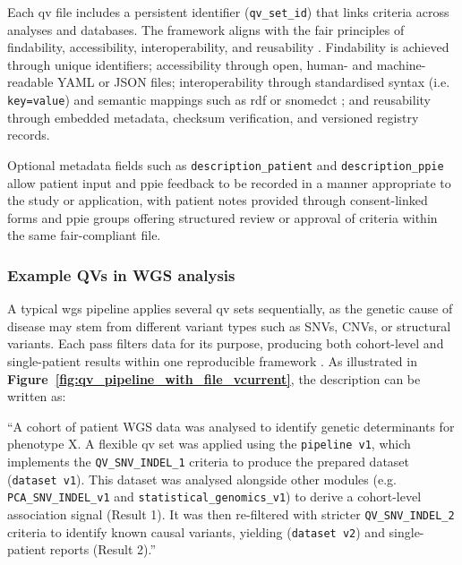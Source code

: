 Each \ac{qv} file includes a persistent identifier (\texttt{qv\_set\_id}) that links criteria across analyses and databases. The framework aligns with the \ac{fair} principles of findability, accessibility, interoperability, and reusability \cite{wilkinson2016fair}. Findability is achieved through unique identifiers; accessibility through open, human- and machine-readable YAML or JSON files; interoperability through standardised syntax (i.e. \texttt{key=value}) and semantic mappings such as \ac{rdf} or \ac{snomedct} \cite{toure2023fairification, van2023bridging}; and reusability through embedded metadata, checksum verification, and versioned registry records.

Optional metadata fields such as \texttt{description\_patient} and \texttt{description\_ppie} allow patient input and \ac{ppie} feedback to be recorded in a manner appropriate to the study or application, with patient notes provided through consent-linked forms and  \ac{ppie} groups offering structured review or approval of criteria within the same \ac{fair}-compliant file.

\subsubsection*{Example QVs in WGS analysis}

A typical \ac{wgs} pipeline applies several \ac{qv} sets sequentially, as the genetic cause of disease may stem from different variant types such as SNVs, CNVs, or structural variants.  
Each pass filters data for its purpose, producing both cohort-level and single-patient results within one reproducible framework \cite{auwera_genomics_2020, li2025statistical}.  
As illustrated in
 \textbf{Figure~\ref{fig:qv_pipeline_with_file_vcurrent}}, the description can be written as:

``A cohort of patient WGS data was analysed to identify genetic determinants for phenotype X. A flexible \ac{qv} set was applied using the 
\colorbox{colorSUNSET1!10}{\texttt{pipeline v1}}, which implements the \colorbox{colorSUNSET2!20}{\texttt{QV\_SNV\_INDEL\_1}} criteria to produce the prepared dataset (\colorbox{colorSUNSET3!10}{\texttt{dataset v1}}). This dataset was analysed alongside other modules (e.g. \colorbox{colorSUNSET4!10}{\texttt{PCA\_SNV\_INDEL\_v1}} and \colorbox{colorSUNSET5!10}{\texttt{statistical\_genomics\_v1}}) to derive a cohort-level association signal (Result 1). It was then re-filtered with stricter \colorbox{colorSUNSET2!20}{\texttt{QV\_SNV\_INDEL\_2}} criteria to identify known causal variants, yielding (\colorbox{colorSUNSET3!10}{\texttt{dataset v2}}) and single-patient reports (Result 2).''

